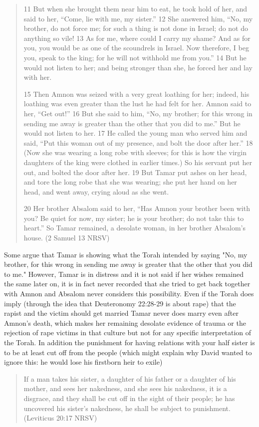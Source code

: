 \documentclass[11pt]{article}
\begin{document}
\begin{quote}
11 But when she brought them near him to eat, he took hold of her, and said to her, “Come, lie with me, my sister.” 12 She answered him, “No, my brother, do not force me; for such a thing is not done in Israel; do not do anything so vile! 13 As for me, where could I carry my shame? And as for you, you would be as one of the scoundrels in Israel. Now therefore, I beg you, speak to the king; for he will not withhold me from you.” 14 But he would not listen to her; and being stronger than she, he forced her and lay with her.

15 Then Amnon was seized with a very great loathing for her; indeed, his loathing was even greater than the lust he had felt for her. Amnon said to her, “Get out!” 16 But she said to him, “No, my brother; for this wrong in sending me away is greater than the other that you did to me.” But he would not listen to her. 17 He called the young man who served him and said, “Put this woman out of my presence, and bolt the door after her.” 18 (Now she was wearing a long robe with sleeves; for this is how the virgin daughters of the king were clothed in earlier times.) So his servant put her out, and bolted the door after her. 19 But Tamar put ashes on her head, and tore the long robe that she was wearing; she put her hand on her head, and went away, crying aloud as she went.

20 Her brother Absalom said to her, “Has Amnon your brother been with you? Be quiet for now, my sister; he is your brother; do not take this to heart.” So Tamar remained, a desolate woman, in her brother Absalom’s house.
(2 Samuel 13 NRSV)
\end{quote}
Some argue that Tamar is showing what the Torah intended by saying "No, my brother, for this wrong in sending me away is greater that the other that you did to me." However, Tamar is in distress and it is not said if her wishes remained the same later on, it is in fact never recorded that she tried to get back together with Amnon and Absalom never considers this possibility. Even if the Torah does imply (through the idea that Deuteronomy 22:28-29 is about rape) that the rapist and the victim should get married Tamar never does marry even after Amnon's death, which makes her remaining desolate evidence of trauma or the rejection of rape victims in that culture but not for any specific interpretation of the Torah. In addition the punishment for having relations with your half sister is to be at least cut off from the people (which might explain why David wanted to ignore this: he would lose his firstborn heir to exile)
\begin{quote}
If a man takes his sister, a daughter of his father or a daughter of his mother, and sees her nakedness, and she sees his nakedness, it is a disgrace, and they shall be cut off in the sight of their people; he has uncovered his sister’s nakedness, he shall be subject to punishment. (Leviticus 20:17 NRSV)
\end{quote}
\end{document}
